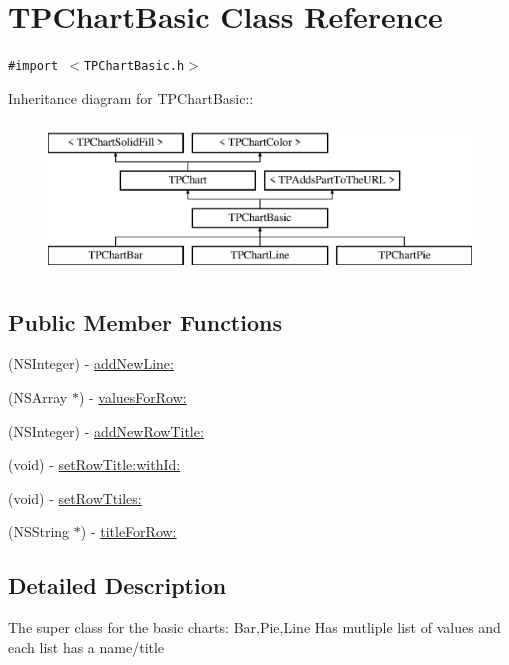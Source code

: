 \hypertarget{interface_t_p_chart_basic}{
\section{TPChartBasic Class Reference}
\label{interface_t_p_chart_basic}
}
{\tt \#import $<$TPChartBasic.h$>$}

Inheritance diagram for TPChartBasic::\begin{figure}[H]
\begin{center}
\leavevmode
\includegraphics[height=4cm]{interface_t_p_chart_basic}
\end{center}
\end{figure}
\subsection*{Public Member Functions}
\begin{CompactItemize}
\item 
(NSInteger) - \hyperlink{interface_t_p_chart_basic_a41306abeba81e4799c5b45eff1fefea}{addNewLine:}
\item 
(NSArray $\ast$) - \hyperlink{interface_t_p_chart_basic_55444751da9bebff034548c8a8c9c05a}{valuesForRow:}
\item 
(NSInteger) - \hyperlink{interface_t_p_chart_basic_dbaf4e508385b4d2b56ff1c5b26fa518}{addNewRowTitle:}
\item 
(void) - \hyperlink{interface_t_p_chart_basic_ac52ed925271b579ff3ec12835ed4179}{setRowTitle:withId:}
\item 
(void) - \hyperlink{interface_t_p_chart_basic_a60b292eef70dacf23030a75f4fd0dd8}{setRowTtiles:}
\item 
(NSString $\ast$) - \hyperlink{interface_t_p_chart_basic_29c20cc728ebf4bca74d1cc0acc51841}{titleForRow:}
\end{CompactItemize}


\subsection{Detailed Description}
The super class for the basic charts: Bar,Pie,Line Has mutliple list of values and each list has a name/title 

